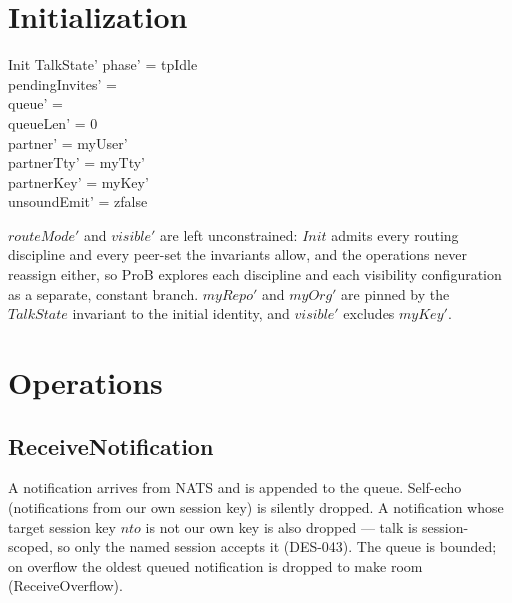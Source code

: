 \documentclass[a4paper,10pt,fleqn]{article}
\begin{document}
\section{Initialization}

\begin{schema}{Init}
  TalkState'
\where
  phase' = tpIdle \\
  pendingInvites' = \emptyset \\
  queue' = \langle \rangle \\
  queueLen' = 0 \\
  partner' = myUser' \\
  partnerTty' = myTty' \\
  partnerKey' = myKey' \\
  unsoundEmit' = zfalse
\end{schema}

$routeMode'$ and $visible'$ are left unconstrained: $Init$ admits every
routing discipline and every peer-set the invariants allow, and the
operations never reassign either, so ProB explores each discipline and
each visibility configuration as a separate, constant branch.  $myRepo'$
and $myOrg'$ are pinned by the $TalkState$ invariant to the initial
identity, and $visible'$ excludes $myKey'$.

\section{Operations}

\subsection{ReceiveNotification}

A notification arrives from NATS and is appended to the queue.
Self-echo (notifications from our own session key) is silently
dropped.  A notification whose target session key $nto$ is not our
own key is also dropped --- talk is session-scoped, so only the named
session accepts it (DES-043).  The queue is bounded; on overflow the
oldest queued notification is dropped to make room (ReceiveOverflow).
\end{document}
